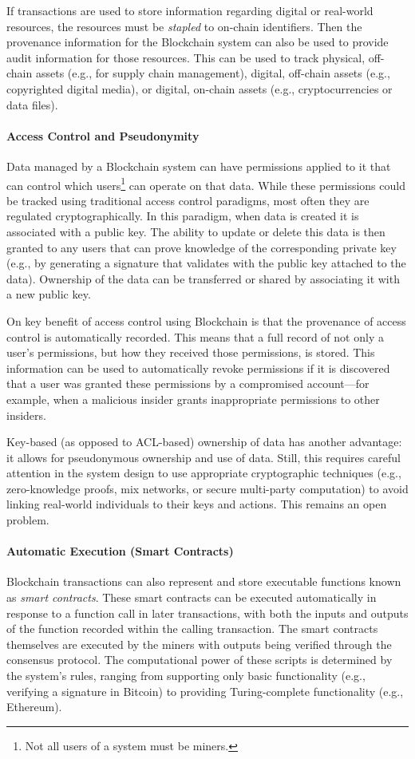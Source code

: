 If transactions are used to store information regarding digital or real-world resources, the resources must be \emph{stapled} to on-chain identifiers. Then the provenance information for the Blockchain system can also be used to provide audit information for those resources.
This can be used to track physical, off-chain assets (e.g., for supply chain management), digital, off-chain assets (e.g., copyrighted digital media), or digital, on-chain assets (e.g., cryptocurrencies or data files).
 
\paragraph{Access Control and Pseudonymity}
Data managed by a Blockchain system can have permissions applied to it that can control which users\footnote{Not all users of a system must be miners.} can operate on that data.
While these permissions could be tracked using traditional access control paradigms, most often they are regulated cryptographically.
In this paradigm, when data is created it is associated with a public key.
The ability to update or delete this data is then granted to any users that can prove knowledge of the corresponding private key (e.g., by generating a signature that validates with the public key attached to the data).
Ownership of the data can be transferred or shared by associating it with a new public key.

On key benefit of access control using Blockchain is that the provenance of access control is automatically recorded.
This means that a full record of not only a user's permissions, but how they received those permissions, is stored.
This information can be used to automatically revoke permissions if it is discovered that a user was granted these permissions by a compromised account---for example, when a malicious insider grants inappropriate permissions to other insiders.

Key-based (as opposed to ACL-based) ownership of data has another advantage: it allows for pseudonymous ownership and use of data.
Still, this requires careful attention in the system design to use appropriate cryptographic techniques (e.g., zero-knowledge proofs, mix networks, or secure multi-party computation) to avoid linking real-world individuals to their keys and actions. This remains an open problem.

\paragraph{Automatic Execution (Smart Contracts)}
Blockchain transactions can also represent and store executable functions known as \emph{smart contracts}.
These smart contracts can be executed automatically in response to a function call in later transactions, with both the inputs and outputs of the function recorded within the calling transaction.
The smart contracts themselves are executed by the miners with outputs being verified through the consensus protocol.
The computational power of these scripts is determined by the system's rules, ranging from supporting only basic functionality (e.g., verifying a signature in Bitcoin) to providing Turing-complete functionality (e.g., Ethereum).

